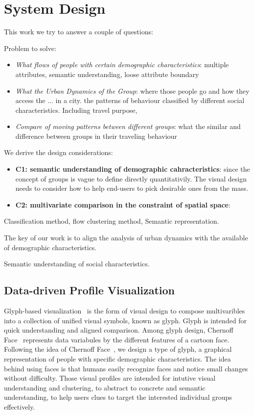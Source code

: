\section{System Design}


This work we try to answer a couple of questions:

Problem to solve: 
\begin{itemize}
\item \textit{What flows of people with certain demographic characteristics}: multiple attributes, semantic understanding, loose attribute boundary
\item \textit{What the Urban Dynamics of the Group}: where those people go and how they access the ... in a city. the patterns of behaviour classified by different social characteristics.  Including travel purpose, 
\item \textit{Compare of moving patterns between different groups}: what the similar and difference between groups in their traveling behaviour
\end{itemize}

We derive the design considerations:

\begin{itemize}
\item \textbf{C1: semantic understanding of demographic cahracteristics}: since the concept of groups is vague to define directly quantitativily. The visual design needs to consider how to help end-users to pick desirable ones from the mass. 
\item \textbf{C2: multivariate comparison in the constraint of spatial space}: 
\end{itemize}

Classification method, flow clustering method, Semantic representation. 

The key of our work is to align the analysis of urban dynamics with the available of demographic characteristics. 

Semantic understanding of social characteristics.

\subsection{Data-driven Profile Visualization}

Glyph-based visualization~\cite{borgo2013glyph} is the form of visual design to compose multivaribles into a collection of unified visual symbols, known as glyph. Glyph is intended for quick understanding and aligned comparison. Among glyph design, Chernoff Face~\cite{chernoff1973use} represents data variabules by the different features of a cartoon face. Following the idea of Chernoff Face~\cite{chernoff1973use}, we design a type of glyph, a graphical representation of people with specific demographic characteristics. The idea behind using faces is that humans easily recognize faces and notice small changes without difficulty. Those visual profiles are intended for intutive visual understanding and clustering, to abstract to concrete and semantic understanding, to help users clues to target the interested individual groups effectively.

